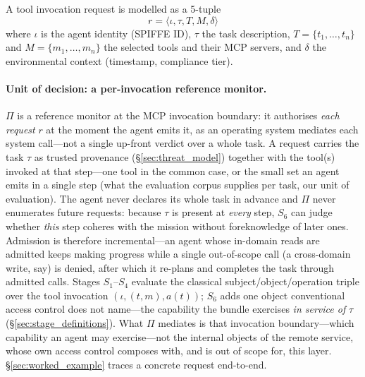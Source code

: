 \documentclass[sigconf,review,anonymous]{acmart}
\begin{document}
A tool invocation request is modelled as a 5-tuple
\begin{equation}
r = \langle \iota, \tau, T, M, \delta \rangle
\label{eq:request}
\end{equation}
where $\iota$ is the agent identity (SPIFFE ID), $\tau$ the task description, $T=\{t_1,\dots,t_n\}$ and $M=\{m_1,\dots,m_n\}$ the selected tools and their MCP servers, and $\delta$ the environmental context (timestamp, compliance tier).

\paragraph{Unit of decision: a per-invocation reference monitor.} $\Pi$ is a reference monitor at the MCP invocation boundary: it authorises \emph{each request} $r$ at the moment the agent emits it, as an operating system mediates each system call---not a single up-front verdict over a whole task. A request carries the task $\tau$ as trusted provenance (\S\ref{sec:threat_model}) together with the tool(s) invoked at that step---one tool in the common case, or the small set an agent emits in a single step (what the evaluation corpus supplies per task, our unit of evaluation). The agent never declares its whole task in advance and $\Pi$ never enumerates future requests: because $\tau$ is present at \emph{every} step, $S_6$ can judge whether \emph{this} step coheres with the mission without foreknowledge of later ones. Admission is therefore incremental---an agent whose in-domain reads are admitted keeps making progress while a single out-of-scope call (a cross-domain write, say) is denied, after which it re-plans and completes the task through admitted calls. Stages $S_1$--$S_4$ evaluate the classical subject/object/operation triple over the tool invocation $(\iota,(t,m),a(t))$; $S_6$ adds one object conventional access control does not name---the capability the bundle exercises \emph{in service of} $\tau$ (\S\ref{sec:stage_definitions}). What $\Pi$ mediates is that invocation boundary---which capability an agent may exercise---not the internal objects of the remote service, whose own access control composes with, and is out of scope for, this layer. \S\ref{sec:worked_example} traces a concrete request end-to-end.
\end{document}
